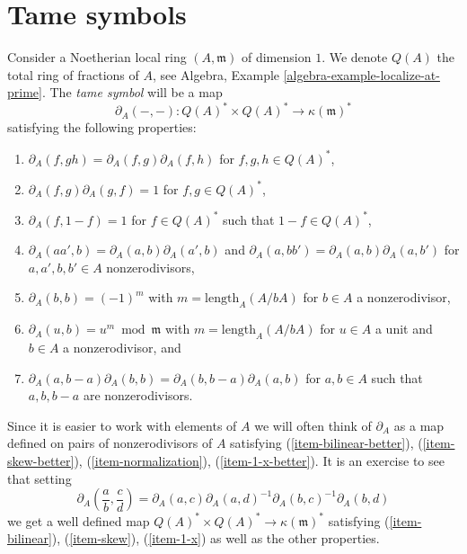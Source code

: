 \documentclass[10pt,a4paper]{amsart}
\theoremstyle{plain}
\theoremstyle{definition}
\theoremstyle{remark}
\numberwithin{equation}{subsection}
\begin{document}
\section{Tame symbols}
\label{section-tame-symbol}

\noindent
Consider a Noetherian local ring $(A, \mathfrak m)$ of dimension $1$.
We denote $Q(A)$ the total ring of fractions of $A$, see
Algebra, Example \ref{algebra-example-localize-at-prime}.
The {\it tame symbol} will be a map
$$
\partial_A(-, -) : Q(A)^* \times Q(A)^* \longrightarrow \kappa(\mathfrak m)^*
$$
satisfying the following properties:
\begin{enumerate}
\item $\partial_A(f, gh) = \partial_A(f, g) \partial_A(f, h)$
\label{item-bilinear}
for $f, g, h \in Q(A)^*$,
\item $\partial_A(f, g) \partial_A(g, f) = 1$
\label{item-skew}
for $f, g \in Q(A)^*$,
\item $\partial_A(f, 1 - f) = 1$
\label{item-1-x}
for $f \in Q(A)^*$ such that $1 - f \in Q(A)^*$,
\item $\partial_A(aa', b) = \partial_A(a, b)\partial_A(a', b)$
\label{item-bilinear-better}
and $\partial_A(a, bb') = \partial_A(a, b)\partial_A(a, b')$
for $a, a', b, b' \in A$ nonzerodivisors,
\item $\partial_A(b, b) = (-1)^m$
\label{item-skew-better}
with $m = \text{length}_A(A/bA)$
for $b \in A$ a nonzerodivisor,
\item $\partial_A(u, b) = u^m \bmod \mathfrak m$
\label{item-normalization}
with $m = \text{length}_A(A/bA)$ for $u \in A$ a unit and
$b \in A$ a nonzerodivisor, and
\item
\label{item-1-x-better}
$\partial_A(a, b - a)\partial_A(b, b) = \partial_A(b, b - a)\partial_A(a, b)$
for $a, b \in A$ such that $a, b, b - a$ are nonzerodivisors.
\end{enumerate}
Since it is easier to work with elements of $A$ we will
often think of $\partial_A$ as a map defined on pairs of
nonzerodivisors of $A$ satisfying (\ref{item-bilinear-better}),
(\ref{item-skew-better}), (\ref{item-normalization}),
(\ref{item-1-x-better}). It is an exercise to see that
setting
$$
\partial_A(\frac{a}{b}, \frac{c}{d}) =
\partial_A(a, c) \partial_A(a, d)^{-1} \partial_A(b, c)^{-1} \partial_A(b, d)
$$
we get a well defined map $Q(A)^* \times Q(A)^* \to \kappa(\mathfrak m)^*$
satisfying (\ref{item-bilinear}), (\ref{item-skew}), (\ref{item-1-x})
as well as the other properties.
\end{document}
